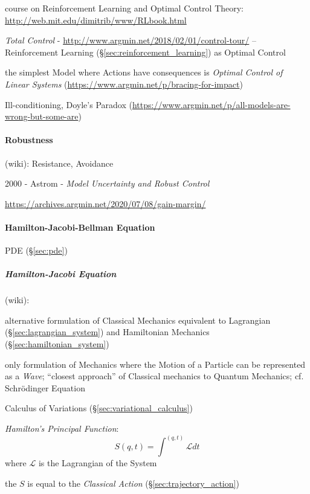 course on Reinforcement Learning and Optimal Control Theory:
\url{http://web.mit.edu/dimitrib/www/RLbook.html}

\emph{Total Control} - \url{http://www.argmin.net/2018/02/01/control-tour/} --
Reinforcement Learning (\S\ref{sec:reinforcement_learning}) as Optimal Control

the simplest Model where Actions have consequences is \emph{Optimal Control of
Linear Systems} (\url{https://www.argmin.net/p/bracing-for-impact})

Ill-conditioning, Doyle's Paradox
(\url{https://www.argmin.net/p/all-models-are-wrong-but-some-are})



\paragraph{Robustness}\label{sec:robustness}\hfill

(wiki): Resistance, Avoidance

2000 - Astrom - \emph{Model Uncertainty and Robust Control}

\url{https://archives.argmin.net/2020/07/08/gain-margin/}



\paragraph{Hamilton-Jacobi-Bellman Equation}
\label{sec:hamilton_jacobi_bellman}\hfill

PDE (\S\ref{sec:pde})



\subparagraph{Hamilton-Jacobi Equation}\label{sec:hamilton_jacobi}\hfill

(wiki):

alternative formulation of Classical Mechanics equivalent to Lagrangian
(\S\ref{sec:lagrangian_system}) and Hamiltonian Mechanics
(\S\ref{sec:hamiltonian_system})

only formulation of Mechanics where the Motion of a Particle can be represented
as a \emph{Wave}; ``closest approach'' of Classical mechanics to Quantum
Mechanics; cf. Schr\"odinger Equation

\fist Calculus of Variations (\S\ref{sec:variational_calculus})

\emph{Hamilton's Principal Function}:
\[
  S(q,t) = \int^{(q,t)} \mathcal{L} dt
\]
where $\mathcal{L}$ is the Lagrangian of the System

the $S$ is equal to the \emph{Classical Action} (\S\ref{sec:trajectory_action})


